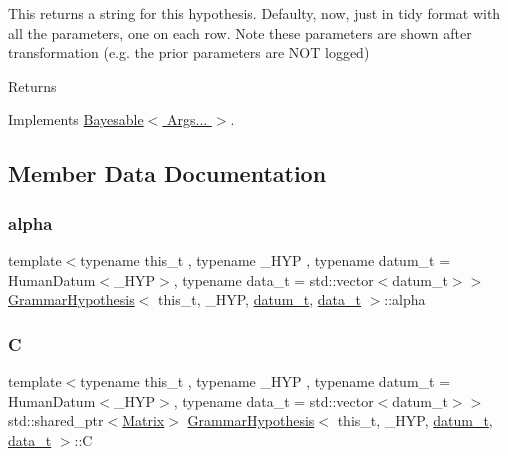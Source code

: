 This returns a string for this hypothesis. Defaulty, now, just in tidy format with all the parameters, one on each row. Note these parameters are shown after transformation (e.\+g. the prior parameters are N\+OT logged) 

\begin{DoxyReturn}{Returns}

\end{DoxyReturn}


Implements \hyperlink{class_bayesable_ab6944b4bfe5620c96048287a51d019c1}{Bayesable$<$ Args... $>$}.



\subsection{Member Data Documentation}
\mbox{\label{class_grammar_hypothesis_aad05b11be3c0249d8a22ab078d28635c}} 
\subsubsection{\texorpdfstring{alpha}{alpha}}
{\footnotesize\ttfamily template$<$typename this\+\_\+t , typename \+\_\+\+H\+YP , typename datum\+\_\+t  = Human\+Datum$<$\+\_\+\+H\+Y\+P$>$, typename data\+\_\+t  = std\+::vector$<$datum\+\_\+t$>$$>$ \\
\hyperlink{class_grammar_hypothesis}{Grammar\+Hypothesis}$<$ this\+\_\+t, \+\_\+\+H\+YP, \hyperlink{class_bayesable_a9f1a6c0cd7855550fa10b1a8f13a5867}{datum\+\_\+t}, \hyperlink{class_bayesable_aa2788c4d7718c0a824e1d28c4c98f921}{data\+\_\+t} $>$\+::alpha}

\mbox{\label{class_grammar_hypothesis_a2b056bde1754e6e18d9a7ebfa753fc60}} 
\subsubsection{\texorpdfstring{C}{C}}
{\footnotesize\ttfamily template$<$typename this\+\_\+t , typename \+\_\+\+H\+YP , typename datum\+\_\+t  = Human\+Datum$<$\+\_\+\+H\+Y\+P$>$, typename data\+\_\+t  = std\+::vector$<$datum\+\_\+t$>$$>$ \\
std\+::shared\+\_\+ptr$<$\hyperlink{_eigen_lib_8h_a645222978e81acfb2523a9bce34aecc0}{Matrix}$>$ \hyperlink{class_grammar_hypothesis}{Grammar\+Hypothesis}$<$ this\+\_\+t, \+\_\+\+H\+YP, \hyperlink{class_bayesable_a9f1a6c0cd7855550fa10b1a8f13a5867}{datum\+\_\+t}, \hyperlink{class_bayesable_aa2788c4d7718c0a824e1d28c4c98f921}{data\+\_\+t} $>$\+::C}

